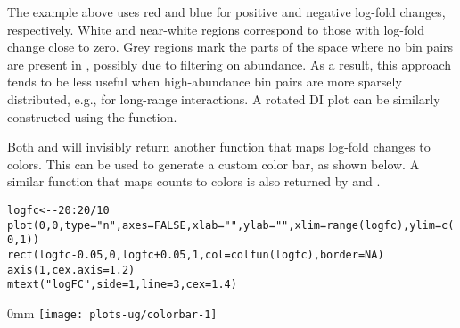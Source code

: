 \documentclass{report}\usepackage[]{graphicx}\usepackage[usenames,dvipsnames]{color}
\makeatletter
\def\maxwidth{ %
  \ifdim\Gin@nat@width>\linewidth
    \linewidth
  \else
    \Gin@nat@width
  \fi
}
\newcommand{\hlnum}[1]{\textcolor[rgb]{0.816,0.125,0.439}{#1}}%
\newcommand{\hlstr}[1]{\textcolor[rgb]{0.251,0.627,0.251}{#1}}%
\newcommand{\hlopt}[1]{\textcolor[rgb]{0,0,0}{#1}}%
\newcommand{\hlstd}[1]{\textcolor[rgb]{0.251,0.251,0.251}{#1}}%
\newcommand{\hlkwb}[1]{\textcolor[rgb]{0,0,0}{#1}}%
\newcommand{\hlkwc}[1]{\textcolor[rgb]{0.251,0.251,0.251}{#1}}%
\newcommand{\hlkwd}[1]{\textcolor[rgb]{0.878,0.439,0.125}{#1}}%
\newenvironment{knitrout}{}{} %
\makeatother
\begin{document}
The example above uses red and blue for positive and negative log-fold changes, respectively.
White and near-white regions correspond to those with log-fold change close to zero.
Grey regions mark the parts of the space where no bin pairs are present in , possibly due to filtering on abundance.
As a result, this approach tends to be less useful when high-abundance bin pairs are more sparsely distributed, e.g., for long-range interactions.
A rotated DI plot can be similarly constructed using the  function.

Both  and  will invisibly return another function that maps log-fold changes to colors.
This can be used to generate a custom color bar, as shown below.
A similar function that maps counts to colors is also returned by  and .

\begin{knitrout}
\color{fgcolor}\begin{kframe}
\begin{alltt}
\hlstd{logfc} \hlkwb{<-} \hlopt{-}\hlnum{20}\hlopt{:}\hlnum{20}\hlopt{/}\hlnum{10}
\hlkwd{plot}\hlstd{(}\hlnum{0}\hlstd{,}\hlnum{0}\hlstd{,}\hlkwc{type}\hlstd{=}\hlstr{"n"}\hlstd{,} \hlkwc{axes}\hlstd{=}\hlnum{FALSE}\hlstd{,} \hlkwc{xlab}\hlstd{=}\hlstr{""}\hlstd{,} \hlkwc{ylab}\hlstd{=}\hlstr{""}\hlstd{,} \hlkwc{xlim}\hlstd{=}\hlkwd{range}\hlstd{(logfc),} \hlkwc{ylim}\hlstd{=}\hlkwd{c}\hlstd{(}\hlnum{0}\hlstd{,}\hlnum{1}\hlstd{))}
\hlkwd{rect}\hlstd{(logfc} \hlopt{-} \hlnum{0.05}\hlstd{,} \hlnum{0}\hlstd{, logfc} \hlopt{+} \hlnum{0.05}\hlstd{,} \hlnum{1}\hlstd{,} \hlkwc{col}\hlstd{=}\hlkwd{colfun}\hlstd{(logfc),} \hlkwc{border}\hlstd{=}\hlnum{NA}\hlstd{)}
\hlkwd{axis}\hlstd{(}\hlnum{1}\hlstd{,} \hlkwc{cex.axis}\hlstd{=}\hlnum{1.2}\hlstd{)}
\hlkwd{mtext}\hlstd{(}\hlstr{"logFC"}\hlstd{,} \hlkwc{side}\hlstd{=}\hlnum{1}\hlstd{,} \hlkwc{line}\hlstd{=}\hlnum{3}\hlstd{,} \hlkwc{cex}\hlstd{=}\hlnum{1.4}\hlstd{)}
\end{alltt}
\end{kframe}\begin{adjustwidth}{\fltoffset}{0mm}
\texttt{[image: plots-ug/colorbar-1]} \end{adjustwidth}
\end{knitrout}

\end{document}
